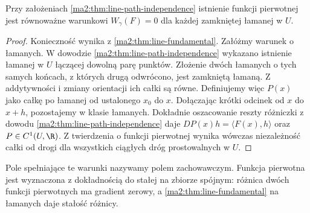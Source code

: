 \begin{wniosek}
\label{ma2:cor:line-polygonal-test}
Przy założeniach \ref{ma2:thm:line-path-independence}
istnienie funkcji pierwotnej jest równoważne
warunkowi $W_\gamma(F)=0$ dla każdej
zamkniętej łamanej w $U$.
\end{wniosek}
\begin{proof}
Konieczność wynika z
\ref{ma2:thm:line-fundamental}.
Załóżmy warunek o łamanych. W dowodzie
\ref{ma2:thm:line-path-independence}
wykazano istnienie łamanej w $U$ łączącej
dowolną parę punktów. Złożenie dwóch łamanych
o tych samych końcach, z których drugą
odwrócono, jest zamkniętą łamaną.
Z addytywności i zmiany orientacji
ich całki są równe. Definiujemy więc
$P(x)$ jako całkę po łamanej od ustalonego
$x_0$ do $x$. Dołączając krótki odcinek
od $x$ do $x+h$, pozostajemy w klasie łamanych.
Dokładnie oszacowanie reszty różniczki
z dowodu \ref{ma2:thm:line-path-independence}
daje $DP(x)h=\langle F(x),h\rangle$
oraz $P\in C^1(U,\R)$. Z twierdzenia
o funkcji pierwotnej wynika wówczas
niezależność całki od drogi dla wszystkich
ciągłych dróg prostowalnych w $U$.
\end{proof}

Pole spełniające te warunki nazywamy
polem zachowawczym. Funkcja pierwotna
jest wyznaczona z dokładnością do stałej
na zbiorze spójnym: różnica dwóch funkcji
pierwotnych ma gradient zerowy, a
\ref{ma2:thm:line-fundamental} na łamanych
daje stałość różnicy.

